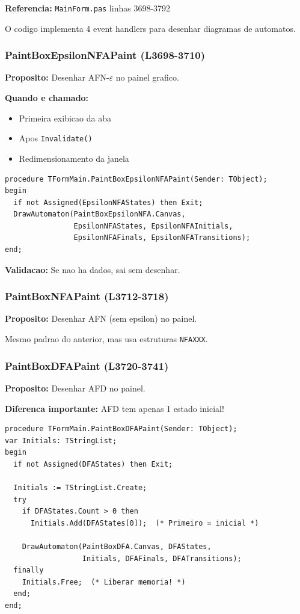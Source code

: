 \documentclass[12pt,a4paper]{article}
\begin{document}
\textbf{Referencia:} \texttt{MainForm.pas} linhas 3698-3792

O codigo implementa 4 event handlers para desenhar diagramas de automatos.

\subsubsection{PaintBoxEpsilonNFAPaint (L3698-3710)}

\textbf{Proposito:} Desenhar AFN-$\varepsilon$ no painel grafico.

\textbf{Quando e chamado:}
\begin{itemize}
    \item Primeira exibicao da aba
    \item Apos \texttt{Invalidate()}
    \item Redimensionamento da janela
\end{itemize}

\begin{lstlisting}[style=pascal]
procedure TFormMain.PaintBoxEpsilonNFAPaint(Sender: TObject);
begin
  if not Assigned(EpsilonNFAStates) then Exit;
  DrawAutomaton(PaintBoxEpsilonNFA.Canvas, 
                EpsilonNFAStates, EpsilonNFAInitials,
                EpsilonNFAFinals, EpsilonNFATransitions);
end;
\end{lstlisting}

\textbf{Validacao:} Se nao ha dados, sai sem desenhar.

\subsubsection{PaintBoxNFAPaint (L3712-3718)}

\textbf{Proposito:} Desenhar AFN (sem epsilon) no painel.

Mesmo padrao do anterior, mas usa estruturas \texttt{NFAXXX}.

\subsubsection{PaintBoxDFAPaint (L3720-3741)}

\textbf{Proposito:} Desenhar AFD no painel.

\textbf{Diferenca importante:} AFD tem apenas 1 estado inicial!

\begin{lstlisting}[style=pascal]
procedure TFormMain.PaintBoxDFAPaint(Sender: TObject);
var Initials: TStringList;
begin
  if not Assigned(DFAStates) then Exit;
  
  Initials := TStringList.Create;
  try
    if DFAStates.Count > 0 then
      Initials.Add(DFAStates[0]);  (* Primeiro = inicial *)
    
    DrawAutomaton(PaintBoxDFA.Canvas, DFAStates, 
                  Initials, DFAFinals, DFATransitions);
  finally
    Initials.Free;  (* Liberar memoria! *)
  end;
end;
\end{lstlisting}
\end{document}
